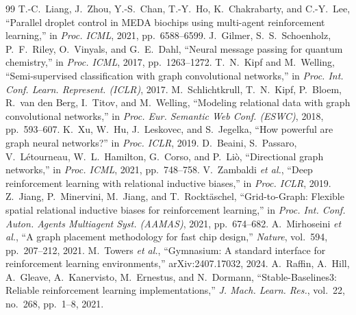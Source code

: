 \documentclass[conference,onecolumn,11pt]{IEEEtran}
\begin{document}
\begin{thebibliography}{99}
 T.-C.~Liang, J.~Zhou, Y.-S.~Chan, T.-Y.~Ho, K.~Chakrabarty, and C.-Y.~Lee, ``Parallel droplet control in MEDA biochips using multi-agent reinforcement learning,'' in \emph{Proc. ICML}, 2021, pp.~6588--6599.
 J.~Gilmer, S.~S.~Schoenholz, P.~F.~Riley, O.~Vinyals, and G.~E.~Dahl, ``Neural message passing for quantum chemistry,'' in \emph{Proc. ICML}, 2017, pp.~1263--1272.
 T.~N.~Kipf and M.~Welling, ``Semi-supervised classification with graph convolutional networks,'' in \emph{Proc. Int. Conf. Learn. Represent. (ICLR)}, 2017.
 M.~Schlichtkrull, T.~N.~Kipf, P.~Bloem, R.~van den Berg, I.~Titov, and M.~Welling, ``Modeling relational data with graph convolutional networks,'' in \emph{Proc. Eur. Semantic Web Conf. (ESWC)}, 2018, pp.~593--607.
 K.~Xu, W.~Hu, J.~Leskovec, and S.~Jegelka, ``How powerful are graph neural networks?'' in \emph{Proc. ICLR}, 2019.
 D.~Beaini, S.~Passaro, V.~L{\'e}tourneau, W.~L.~Hamilton, G.~Corso, and P.~Li{\`o}, ``Directional graph networks,'' in \emph{Proc. ICML}, 2021, pp.~748--758.
 V.~Zambaldi \emph{et al.}, ``Deep reinforcement learning with relational inductive biases,'' in \emph{Proc. ICLR}, 2019.
 Z.~Jiang, P.~Minervini, M.~Jiang, and T.~Rockt{\"a}schel, ``Grid-to-Graph: Flexible spatial relational inductive biases for reinforcement learning,'' in \emph{Proc. Int. Conf. Auton. Agents Multiagent Syst. (AAMAS)}, 2021, pp.~674--682.
 A.~Mirhoseini \emph{et al.}, ``A graph placement methodology for fast chip design,'' \emph{Nature}, vol.~594, pp.~207--212, 2021.
 M.~Towers \emph{et al.}, ``Gymnasium: A standard interface for reinforcement learning environments,'' arXiv:2407.17032, 2024.
 A.~Raffin, A.~Hill, A.~Gleave, A.~Kanervisto, M.~Ernestus, and N.~Dormann, ``Stable-Baselines3: Reliable reinforcement learning implementations,'' \emph{J. Mach. Learn. Res.}, vol.~22, no.~268, pp.~1--8, 2021.
\end{thebibliography}
\end{document}
